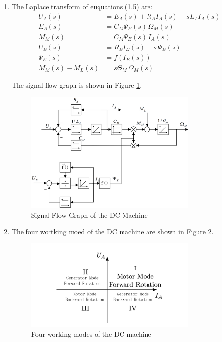 \documentclass[12pt,a4paper, openany]{book}
\begin{document}
\begin{enumerate}
\item {\bf *}  The Laplace transform of euquations (1.5) are:
\begin{align}
    U_A(s) &= E_A(s) + R_A I_A(s) + s L_A I_A(s) \tag{1.5a} \\[6pt]
    E_A(s) &= C_M \Psi_E(s)\,\Omega_M(s) \tag{1.5b} \\[6pt]
    M_M(s) &= C_M \Psi_E(s)\, I_A(s) \tag{1.5c} \\[6pt]
    U_E(s) &= R_E I_E(s) + s\, \Psi_E(s) \tag{1.5d} \\[6pt]
    \Psi_E(s) &= f(I_E(s)) \tag{1.5e} \\[6pt]
    M_M(s) - M_L(s) &= s \Theta_M  \, \Omega_M(s) \tag{1.5f}
\end{align}

The signal flow graph is shown in Figure \ref{fig:Signal Flow Graph of the DC Machine}.
\begin{figure}[H]
    \centering
    \includegraphics[width=0.8\textwidth]{figures/block diagram of DC machine.png}
    \caption{Signal Flow Graph of the DC Machine}
    \label{fig:Signal Flow Graph of the DC Machine}
\end{figure}    
\item {\bf *} 
The four wortking moed of the DC machine are shown in Figure \ref{fig:Four_working_modes_of_the_DC_machine}.
\begin{figure}[H]
    \centering
    \includegraphics[width=0.8\textwidth]{figures/Four working modes of the DC machine.png}
    \caption{Four working modes of the DC machine}
    \label{fig:Four_working_modes_of_the_DC_machine}
\end{figure}


\end{enumerate}
\end{document}
